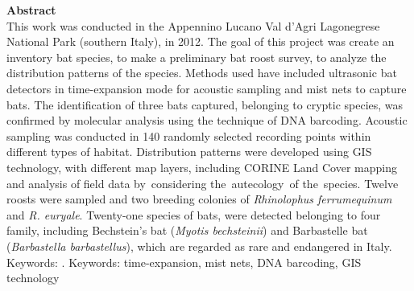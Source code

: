 {\columnbreak

\textbf{Abstract}\\
This work was conducted in the Appennino Lucano Val d’Agri Lagonegrese National Park (southern Italy), in 2012. The goal of this project was create an inventory bat species, to make a preliminary bat roost survey, to analyze the distribution patterns of the species. Methods used have included ultrasonic bat detectors in time-expansion mode for acoustic sampling and mist nets to capture bats. The identification of three bats captured, belonging to cryptic species, was confirmed by molecular analysis using the technique of DNA barcoding. Acoustic sampling was conducted in 140 randomly selected recording points within different types of habitat. Distribution patterns were developed using GIS technology, with different map layers, including CORINE Land Cover mapping and analysis of field data  by considering the autecology of the species. Twelve roosts were sampled and two breeding colonies of \emph{Rhinolophus ferrumequinum} and \emph{R. euryale}. Twenty-one species of bats, were detected belonging to four family, including Bechstein’s bat (\emph{Myotis bechsteinii}) and Barbastelle bat (\emph{Barbastella barbastellus}), which are regarded as rare and endangered in Italy.\\

Keywords: .
{\footnotesize Keywords: time-expansion, mist nets,  DNA barcoding, GIS technology} 
} %